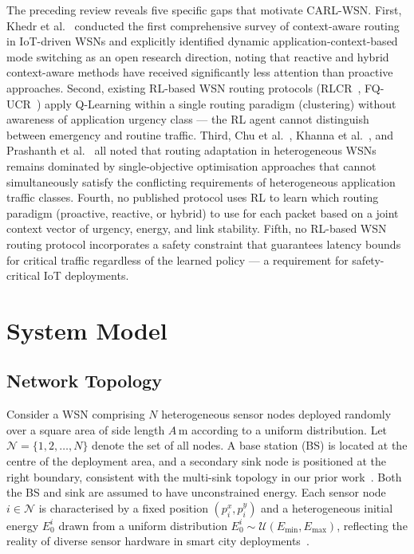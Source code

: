 \documentclass[12pt]{article}
\begin{document}
The preceding review reveals five specific gaps that motivate CARL-WSN.
First, Khedr et al.~\cite{roberts2025} conducted the first
comprehensive survey of context-aware routing in IoT-driven WSNs and
explicitly identified dynamic application-context-based mode switching
as an open research direction, noting that reactive and hybrid
context-aware methods have received significantly less attention than
proactive approaches. Second, existing RL-based WSN routing protocols
(RLCR~\cite{daanoune_intelligent_2026},
FQ-UCR~\cite{wang_fqucr_2025}) apply Q-Learning within a single
routing paradigm (clustering) without awareness of application
urgency class --- the RL agent cannot distinguish between emergency
and routine traffic. Third, Chu et al.~\cite{chu_leach_2026}, Khanna
et al.~\cite{khanna_energy-efficient_2021}, and Prashanth
et al.~\cite{prashanth2023} all noted that routing adaptation in
heterogeneous WSNs remains dominated by single-objective optimisation
approaches that cannot simultaneously satisfy the conflicting
requirements of heterogeneous application traffic classes.
Fourth, no published protocol uses RL to learn
which routing paradigm (proactive, reactive, or hybrid) to use for
each packet based on a joint context vector of urgency, energy, and
link stability. Fifth, no RL-based WSN routing protocol incorporates
a safety constraint that guarantees latency bounds for critical
traffic regardless of the learned policy --- a requirement for
safety-critical IoT deployments.

\section{System Model}
\label{sec:model}

\subsection{Network Topology}

Consider a WSN comprising $N$ heterogeneous sensor nodes deployed
randomly over a square area of side length $A$\,m according to a
uniform distribution. Let $\mathcal{N} = \{1, 2, \ldots, N\}$ denote
the set of all nodes. A base station (BS) is located at the centre of
the deployment area, and a secondary sink node is positioned at the
right boundary, consistent with the multi-sink topology in our prior
work~\cite{salman2023}. Both the BS and sink are assumed to have
unconstrained energy. Each sensor node $i \in \mathcal{N}$ is
characterised by a fixed position $(p_i^x, p_i^y)$ and a
heterogeneous initial energy $E_0^i$ drawn from a uniform distribution
$E_0^i \sim \mathcal{U}(E_{\min}, E_{\max})$, reflecting the reality
of diverse sensor hardware in smart city deployments~\cite{salman2021}.
\end{document}
